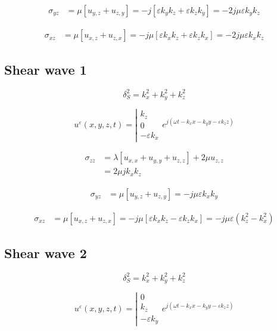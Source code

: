 \documentclass[11pt,A4paper]{book}
\renewcommand{\:}{\tb{:}}
\newcommand{\eps}{\varepsilon}
\begin{document}
\begin{align}
	\sigma_{yz}&=\mu \left[ u_{y,z}+u_{z,y}\right]=-j\left[ \eps k_yk_z+ \eps k_zk_y\right]=-2j\mu\eps k_yk_z
\end{align}


\begin{align}
	\sigma_{xz}&=\mu \left[ u_{x,z}+u_{z,x}\right]=-j\mu\left[ \eps k_xk_z+ \eps k_zk_x\right]=-2j\mu\eps k_xk_z
\end{align}


\subsection{Shear wave 1}

\begin{equation}
	\delta_S^2=k_x^2+k_y^2+k_z^2
\end{equation}

\begin{equation}
u^{\eps}(x,y,z,t)=\left| 
\begin{array}{c}
{k_z}\\
{0}\\
{-\eps k_x}
\end{array}
\right.
e^{j(\omega t- k_x x-k_y y-\eps k_z z)}
\end{equation}

\begin{align}
	\sigma_{zz}&=\lambda\left[
	u_{x,x}+u_{y,y}+u_{z,z}
	\right]+2\mu u_{z,z}\\
	&=2\mu jk_xk_z
\end{align}

\begin{align}
	\sigma_{yz}&=\mu \left[ u_{y,z}+u_{z,y}\right]=-j\mu\eps k_xk_y
\end{align}


\begin{align}
	\sigma_{xz}&=\mu \left[ u_{x,z}+u_{z,x}\right]=-j\mu\left[ \eps k_xk_z- \eps k_zk_x\right]=-j\mu\eps (k_z^2-k_x^2)
\end{align}


\subsection{Shear wave 2}

\begin{equation}
	\delta_S^2=k_x^2+k_y^2+k_z^2
\end{equation}

\begin{equation}
u^{\eps}(x,y,z,t)=\left| 
\begin{array}{c}
{0}\\
{k_z}\\
{-\eps k_y}
\end{array}
\right.
e^{j(\omega t- k_x x-k_y y-\eps k_z z)}
\end{equation}
\end{document}
